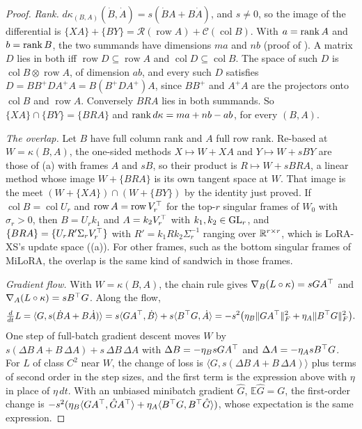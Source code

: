 \begin{proof}
\emph{Rank.} $d\kappa_{(B,A)}(\dot B,\dot A)=s(\dot BA+B\dot A)$, and $s\ne0$, so the image of the differential is
$\{XA\}+\{BY\}=\mathcal R(\operatorname{row}A)+\mathcal C(\operatorname{col}B)$. With $a=\operatorname{rank} A$ and $b=\operatorname{rank} B$, the two
summands have dimensions $ma$ and $nb$ (proof of ). A matrix $D$ lies in both iff
$\operatorname{row}D\subseteq\operatorname{row}A$ and $\operatorname{col}D\subseteq\operatorname{col}B$. The space of such
$D$ is $\operatorname{col}B\otimes\operatorname{row}A$, of dimension $ab$, and every such $D$ satisfies
$D=BB^+DA^+A=B(B^+DA^+)A$, since $BB^+$ and $A^+A$ are the projectors onto $\operatorname{col}B$ and
$\operatorname{row}A$. Conversely $BRA$ lies in both summands. So $\{XA\}\cap\{BY\}=\{BRA\}$ and
$\operatorname{rank} d\kappa=ma+nb-ab$, for every $(B,A)$.

\emph{The overlap.} Let $B$ have full column rank and $A$ full row rank. Re-based at $W=\kappa(B,A)$, the one-sided methods
$X\mapsto W+XA$ and $Y\mapsto W+sBY$ are those of (a) with frames $A$ and $sB$, so their product is
$R\mapsto W+sBRA$, a linear method whose image $W+\{BRA\}$ is its own tangent space at $W$. That image is the meet
$(W+\{XA\})\cap(W+\{BY\})$ by the identity just proved. If $\operatorname{col}B=\operatorname{col}U_r$ and
$\operatorname{row}A=\operatorname{row}V_r^{\top}$ for the top-$r$ singular frames of $W_0$ with $\sigma_r>0$, then $B=U_rk_1$ and
$A=k_2V_r^{\top}$ with $k_1,k_2\in\mathrm{GL}_r$, and $\{BRA\}=\{U_rR'\Sigma_rV_r^{\top}\}$ with $R'=k_1Rk_2\Sigma_r^{-1}$ ranging over
$\mathbb{R}^{r\times r}$, which is LoRA-XS's update space ((a)). For other frames, such as the bottom
singular frames of MiLoRA, the overlap is the same kind of sandwich in those frames.

\emph{Gradient flow.} With $W=\kappa(B,A)$, the chain rule gives $\nabla_B(L\circ\kappa)=sGA^{\top}$ and
$\nabla_A(L\circ\kappa)=sB^{\top} G$. Along the flow,
\begin{equation*}
  \tfrac{d}{dt}L=\langle G,s(\dot BA+B\dot A)\rangle=s\langle GA^{\top},\dot B\rangle+s\langle B^{\top} G,\dot A\rangle
  =-s^2\big(\eta_B\|GA^{\top}\|_F^2+\eta_A\|B^{\top} G\|_F^2\big).
\end{equation*}
One step of full-batch gradient descent moves $W$ by $s(\Delta B\,A+B\,\Delta A)+s\,\Delta B\,\Delta A$ with
$\Delta B=-\eta_BsGA^{\top}$ and $\Delta A=-\eta_AsB^{\top} G$. For $L$ of class $C^2$ near $W$, the change of loss is
$\langle G,s(\Delta B\,A+B\,\Delta A)\rangle$ plus terms of second order in the step sizes, and the first term is the
expression above with $\eta$ in place of $\eta\,dt$. With an unbiased minibatch gradient $\hat G$, $\mathbb E\hat G=G$, the
first-order change is $-s^2(\eta_B\langle GA^{\top},\hat GA^{\top}\rangle+\eta_A\langle B^{\top} G,B^{\top}\hat G\rangle)$, whose expectation is
the same expression.


\end{proof}
